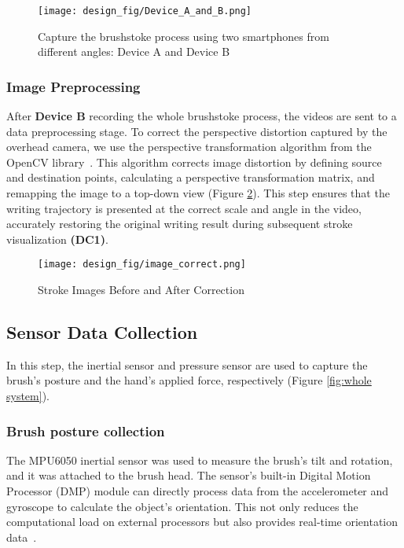 \begin{figure}[t!]
    \centering
    \texttt{[image: design\_fig/Device\_A\_and\_B.png]}
    \caption{Capture the brushstoke process using two smartphones from different angles: Device A and Device B}
    \label{fig:device A and B}
\end{figure}

\subsubsection{Image Preprocessing}
After \textbf{Device B} recording the whole brushstoke process, the videos are sent to a data preprocessing stage. To correct the perspective distortion captured by the overhead camera, we use the perspective transformation algorithm from the OpenCV library~\cite{opencv_library}. This algorithm corrects image distortion by defining source and destination points, calculating a perspective transformation matrix, and remapping the image to a top-down view (Figure \ref{fig:view_correct}). This step ensures that the writing trajectory is presented at the correct scale and angle in the video, accurately restoring the original writing result during subsequent stroke visualization \textbf{(DC1)}. 

\begin{figure}[htbp]
    \centering
    \texttt{[image: design\_fig/image\_correct.png]}
    \caption{Stroke Images Before and After Correction}
    \label{fig:view_correct}
\end{figure}



\subsection{Sensor Data Collection}
In this step, the inertial sensor and pressure sensor are used to capture the brush's posture and the hand's applied force, respectively (Figure \ref{fig:whole system}). 
 
\subsubsection{Brush posture collection}
The MPU6050 inertial sensor was used to measure the brush's tilt and rotation, and it was attached to the brush head. The sensor's built-in Digital Motion Processor (DMP) module can directly process data from the accelerometer and gyroscope to calculate the object's orientation. This not only reduces the computational load on external processors but also provides real-time orientation data~\cite{widagdo2017limb}. 

